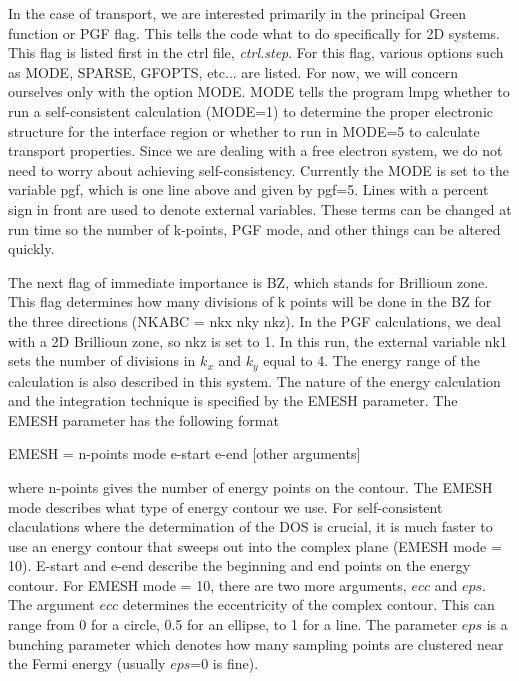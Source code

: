 \documentclass[10pt]{article}
\begin{document}
In the case of transport, we are interested primarily in the principal Green function or PGF flag.  This tells the code what to do specifically for 2D systems.  This flag is listed first in the ctrl file, \textit{ctrl.step}.  For this flag, various options such as MODE, SPARSE, GFOPTS, etc... are listed.  For now, we will concern ourselves only with the option MODE.  MODE tells the program lmpg whether to run a self-consistent calculation (MODE=1) to determine the proper electronic structure for the interface region or whether to run in MODE=5 to calculate transport properties.  Since we are dealing with a free electron system, we do not need to worry about achieving self-consistency.  Currently the MODE is set to the variable pgf, which is one line above and given by pgf=5.  Lines with a percent sign in front are used to denote external variables.  These terms can be changed at run time so the number of k-points, PGF mode, and other things can be altered quickly.

The next flag of immediate importance is BZ, which stands for Brillioun zone.  This flag determines how many divisions of k points will be done in the BZ for the three directions (NKABC = nkx nky nkz).  In the PGF calculations, we deal with a 2D Brillioun zone, so nkz is set to 1.  In this run, the external variable nk1 sets the number of divisions in $k_{x}$ and $k_{y}$ equal to 4.  The energy range of the calculation is also described in this system.  The nature of the energy calculation and the integration technique is specified by the EMESH parameter.  The EMESH parameter has the following format

\begin{center}
EMESH = n-points mode e-start e-end [other arguments]
\end{center}
where n-points gives the number of energy points on the contour.  The EMESH mode describes what type of energy contour we use.  For self-consistent claculations where the determination of the DOS is crucial, it is much faster to use an energy contour that sweeps out into the complex plane (EMESH mode = 10).  E-start and e-end describe the beginning and end points on the energy contour.  For EMESH mode = 10, there are two more arguments, $ecc$ and $eps$.  The argument $ecc$ determines the eccentricity of the complex contour.  This can range from 0 for a circle, 0.5 for an ellipse, to 1 for a line.  The parameter $eps$ is a bunching parameter which denotes how many sampling points are clustered near the Fermi energy (usually $eps$=0 is fine).  
\end{document}
